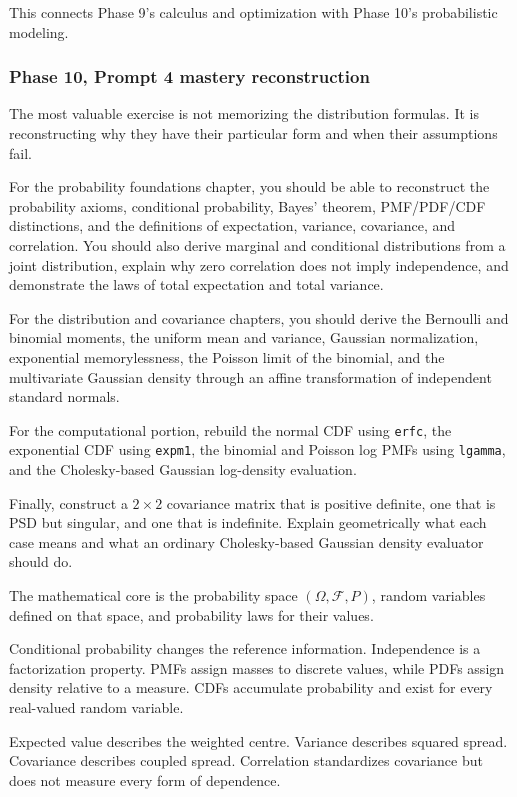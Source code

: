 This connects Phase 9's calculus and optimization with Phase 10's probabilistic modeling.

\subsubsection{Phase 10, Prompt 4 mastery reconstruction}\label{phase-10-prompt-4-mastery-reconstruction}

The most valuable exercise is not memorizing the distribution formulas. It is reconstructing why they have their particular form and when their assumptions fail.

For the probability foundations chapter, you should be able to reconstruct the probability axioms, conditional probability, Bayes' theorem, PMF/PDF/CDF distinctions, and the definitions of expectation, variance, covariance, and correlation. You should also derive marginal and conditional distributions from a joint distribution, explain why zero correlation does not imply independence, and demonstrate the laws of total expectation and total variance.

For the distribution and covariance chapters, you should derive the Bernoulli and binomial moments, the uniform mean and variance, Gaussian normalization, exponential memorylessness, the Poisson limit of the binomial, and the multivariate Gaussian density through an affine transformation of independent standard normals.

For the computational portion, rebuild the normal CDF using \texttt{erfc}, the exponential CDF using \texttt{expm1}, the binomial and Poisson log PMFs using \texttt{lgamma}, and the Cholesky-based Gaussian log-density evaluation.

Finally, construct a \(2\times2\) covariance matrix that is positive definite, one that is PSD but singular, and one that is indefinite. Explain geometrically what each case means and what an ordinary Cholesky-based Gaussian density evaluator should do.

The mathematical core is the probability space \((\Omega,\mathcal F,P)\), random variables defined on that space, and probability laws for their values.

Conditional probability changes the reference information. Independence is a factorization property. PMFs assign masses to discrete values, while PDFs assign density relative to a measure. CDFs accumulate probability and exist for every real-valued random variable.

Expected value describes the weighted centre. Variance describes squared spread. Covariance describes coupled spread. Correlation standardizes covariance but does not measure every form of dependence.

